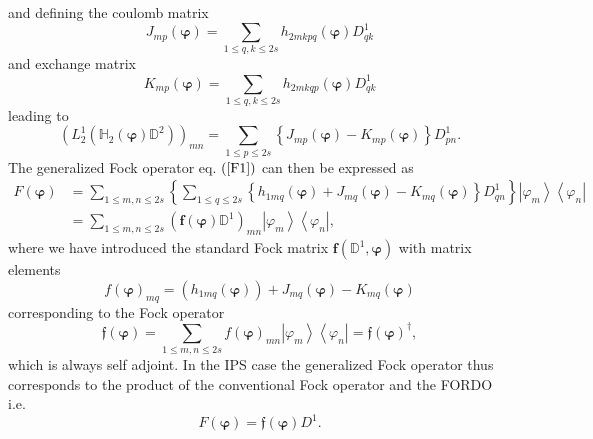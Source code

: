 \documentclass[aps,preprint]{revtex4}%
\begin{document}
and defining the coulomb matrix
\begin{equation}
J_{mp}\left(  \mathbf{\varphi}\right)  =\sum_{1\leq q,k\leq2s}h_{2mkpq}\left(
\mathbf{\varphi}\right)  D_{qk}^{1}%
\end{equation}
and exchange matrix
\begin{equation}
K_{mp}\left(  \mathbf{\varphi}\right)  =\sum_{1\leq q,k\leq2s}h_{2mkqp}\left(
\mathbf{\varphi}\right)  D_{qk}^{1}%
\end{equation}
leading to
\begin{equation}
\left(  L_{2}^{1}\left(  \mathbb{H}_{2}\left(  \mathbf{\varphi}\right)
\mathbb{D}^{2}\right)  \right)  _{mn}=\sum_{1\leq p\leq2s}\left\{
J_{mp}\left(  \mathbf{\varphi}\right)  -K_{mp}\left(  \mathbf{\varphi}\right)
\right\}  D_{pn}^{1}.
\end{equation}
The generalized Fock operator eq. $\left(  \ref{F1}\right)  $ can then be
expressed as
\begin{align}
F\left(  \mathbf{\varphi}\right)   &  =\sum_{1\leq m,n\leq2s}\left\{
\sum_{1\leq q\leq2s}\left\{  h_{1mq}\left(  \mathbf{\varphi}\right)
+J_{mq}\left(  \mathbf{\varphi}\right)  -K_{mq}\left(  \mathbf{\varphi
}\right)  \right\}  D_{qn}^{1}\right\}  \left\vert \varphi_{m}\right\rangle
\left\langle \varphi_{n}\right\vert \nonumber\\
&  =\sum_{1\leq m,n\leq2s}\left(  \mathbf{f}\left(  \mathbf{\varphi}\right)
\mathbb{D}^{1}\right)  _{mn}\left\vert \varphi_{m}\right\rangle \left\langle
\varphi_{n}\right\vert ,
\end{align}
where we have introduced the standard Fock matrix $\mathbf{f}\left(
\mathbb{D}^{1},\mathbf{\varphi}\right)  $ with matrix elements
\begin{equation}
f\left(  \mathbf{\varphi}\right)  _{mq}=\left(  h_{1mq}\left(  \mathbf{\varphi
}\right)  \right)  +J_{mq}\left(  \mathbf{\varphi}\right)  -K_{mq}\left(
\mathbf{\varphi}\right)
\end{equation}
corresponding to the Fock operator
\begin{equation}
\mathfrak{f}\left(  \mathbf{\varphi}\right)  =\sum_{1\leq m,n\leq2s}f\left(
\mathbf{\varphi}\right)  _{mn}\left\vert \varphi_{m}\right\rangle \left\langle
\varphi_{n}\right\vert =\mathfrak{f}\left(  \mathbf{\varphi}\right)
^{\dagger},
\end{equation}
which is always self adjoint. In the IPS case the generalized Fock operator
thus corresponds to the product of the conventional Fock operator and the
FORDO i.e.
\begin{equation}
F\left(  \mathbf{\varphi}\right)  =\mathfrak{f}\left(  \mathbf{\varphi
}\right)  D^{1}.
\end{equation}
\end{document}
